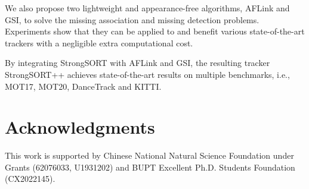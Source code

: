 \documentclass[lettersize,journal]{IEEEtran}
\begin{document}
We also propose two lightweight and appearance-free algorithms, AFLink and GSI, 
to solve the missing association and missing detection problems.
Experiments show that they can be applied to and benefit various state-of-the-art trackers with a negligible extra computational cost.

By integrating StrongSORT with AFLink and GSI, the resulting tracker StrongSORT++
achieves state-of-the-art results on multiple benchmarks, i.e., MOT17, MOT20, DanceTrack and KITTI.


\section*{Acknowledgments}
This work is supported by Chinese National Natural Science Foundation under Grants (62076033, U1931202)
and BUPT Excellent Ph.D. Students Foundation (CX2022145).





















\end{document}
